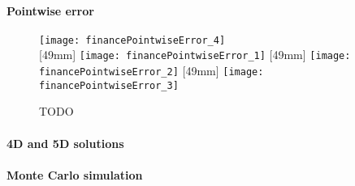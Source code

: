 \paragraph{Pointwise error}

\begin{figure}
  \texttt{[image: financePointwiseError\_4]}%
  \\[2mm]%
  [49mm]{%
    \texttt{[image: financePointwiseError\_1]}%
  }%
  \hfill%
  [49mm]{%
    \texttt{[image: financePointwiseError\_2]}%
  }%
  \hfill%
  [49mm]{%
    \texttt{[image: financePointwiseError\_3]}%
  }%
  \caption[TODO]{%
    TODO%
  }%
  \label{fig:financePointwiseError}%
\end{figure}

\dummytext[3]{}

\paragraph{4D and 5D solutions}

\dummytext[2]{}

\paragraph{Monte Carlo simulation}



